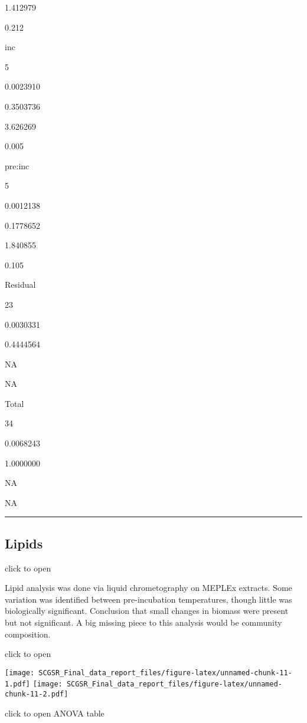 \documentclass[
]{article}
\begin{document}
1.412979

0.212

inc

5

0.0023910

0.3503736

3.626269

0.005

pre:inc

5

0.0012138

0.1778652

1.840855

0.105

Residual

23

0.0030331

0.4444564

NA

NA

Total

34

0.0068243

1.0000000

NA

NA

\begin{center}\rule{0.5\linewidth}{0.5pt}\end{center}

\hypertarget{lipids}{%
\subsection{Lipids}\label{lipids}}

click to open

Lipid analysis was done via liquid chrometography on MEPLEx extracts.
Some variation was identified between pre-incubation temperatures,
though little was biologically significant. Conclusion that small
changes in biomass were present but not significant. A big missing piece
to this analysis would be community composition.

click to open

\texttt{[image: SCGSR\_Final\_data\_report\_files/figure-latex/unnamed-chunk-11-1.pdf]}
\texttt{[image: SCGSR\_Final\_data\_report\_files/figure-latex/unnamed-chunk-11-2.pdf]}

click to open ANOVA table
\end{document}
